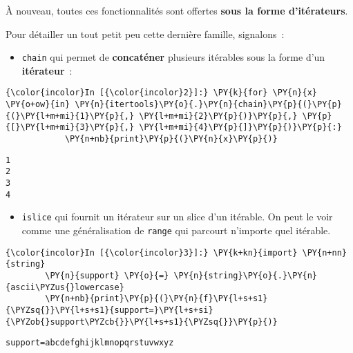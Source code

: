 À nouveau, toutes ces fonctionnalités sont offertes \textbf{sous la
forme d'itérateurs}.

    Pour détailler un tout petit peu cette dernière famille, signalons~:

    \begin{itemize}
\tightlist
\item
  \texttt{chain} qui permet de \textbf{concaténer} plusieurs itérables
  sous la forme d'un \textbf{itérateur}~:
\end{itemize}

    \begin{Verbatim}[commandchars=\\\{\}]
{\color{incolor}In [{\color{incolor}2}]:} \PY{k}{for} \PY{n}{x} \PY{o+ow}{in} \PY{n}{itertools}\PY{o}{.}\PY{n}{chain}\PY{p}{(}\PY{p}{(}\PY{l+m+mi}{1}\PY{p}{,} \PY{l+m+mi}{2}\PY{p}{)}\PY{p}{,} \PY{p}{[}\PY{l+m+mi}{3}\PY{p}{,} \PY{l+m+mi}{4}\PY{p}{]}\PY{p}{)}\PY{p}{:}
            \PY{n+nb}{print}\PY{p}{(}\PY{n}{x}\PY{p}{)}
\end{Verbatim}


    \begin{Verbatim}[commandchars=\\\{\}]
1
2
3
4

    \end{Verbatim}

    \begin{itemize}
\tightlist
\item
  \texttt{islice} qui fournit un itérateur sur un slice d'un itérable.
  On peut le voir comme une généralisation de \texttt{range} qui
  parcourt n'importe quel itérable.
\end{itemize}

    \begin{Verbatim}[commandchars=\\\{\}]
{\color{incolor}In [{\color{incolor}3}]:} \PY{k+kn}{import} \PY{n+nn}{string}
        \PY{n}{support} \PY{o}{=} \PY{n}{string}\PY{o}{.}\PY{n}{ascii\PYZus{}lowercase}
        \PY{n+nb}{print}\PY{p}{(}\PY{n}{f}\PY{l+s+s1}{\PYZsq{}}\PY{l+s+s1}{support=}\PY{l+s+si}{\PYZob{}support\PYZcb{}}\PY{l+s+s1}{\PYZsq{}}\PY{p}{)}
\end{Verbatim}


    \begin{Verbatim}[commandchars=\\\{\}]
support=abcdefghijklmnopqrstuvwxyz

    \end{Verbatim}

